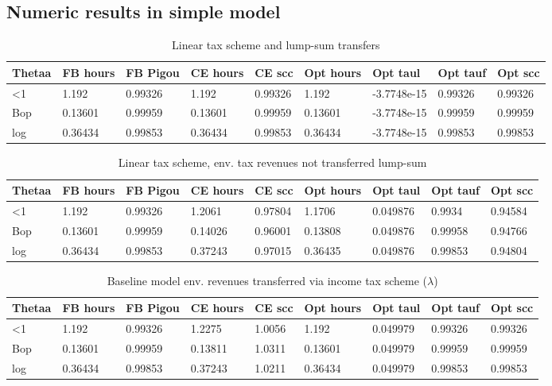 \subsection{Numeric results in simple model}
\begin{table}[h!!]
	\caption{Linear tax scheme and lump-sum transfers}\label{tab:lin_lst}
	\begin{tabular}{lllllllll}
		Thetaa & FB hours & FB Pigou & CE hours & CE scc & Opt hours & Opt taul & Opt tauf & Opt scc \\ 
		\hline 
		<1 & 1.192 & 0.99326 & 1.192 & 0.99326 & 1.192 & -3.7748e-15 & 0.99326 & 0.99326 \\ 
		Bop & 0.13601 & 0.99959 & 0.13601 & 0.99959 & 0.13601 & -3.7748e-15 & 0.99959 & 0.99959 \\ 
		log & 0.36434 & 0.99853 & 0.36434 & 0.99853 & 0.36434 & -3.7748e-15 & 0.99853 & 0.99853 \\ 
		\hline 
	\end{tabular}
\end{table}
\begin{table}
	\caption{Linear tax scheme, env. tax revenues not transferred lump-sum}\label{tab:lin_nolst}
	\begin{tabular}{lllllllll}
		Thetaa & FB hours & FB Pigou & CE hours & CE scc & Opt hours & Opt taul & Opt tauf & Opt scc \\ 
		\hline 
		<1 & 1.192 & 0.99326 & 1.2061 & 0.97804 & 1.1706 & 0.049876 & 0.9934 & 0.94584 \\ 
		Bop & 0.13601 & 0.99959 & 0.14026 & 0.96001 & 0.13808 & 0.049876 & 0.99958 & 0.94766 \\ 
		log & 0.36434 & 0.99853 & 0.37243 & 0.97015 & 0.36435 & 0.049876 & 0.99853 & 0.94804 \\ 
		\hline 
	\end{tabular}
\end{table}
\begin{table}[h!!]
	\caption{Baseline model env. revenues transferred via income tax scheme ($\lambda$)}\label{tab:base}
	\begin{tabular}{lllllllll}
		Thetaa & FB hours & FB Pigou & CE hours & CE scc & Opt hours & Opt taul & Opt tauf & Opt scc \\ 
		\hline 
		<1 & 1.192 & 0.99326 & 1.2275 & 1.0056 & 1.192 & 0.049979 & 0.99326 & 0.99326 \\ 
		Bop & 0.13601 & 0.99959 & 0.13811 & 1.0311 & 0.13601 & 0.049979 & 0.99959 & 0.99959 \\ 
		log & 0.36434 & 0.99853 & 0.37243 & 1.0211 & 0.36434 & 0.049979 & 0.99853 & 0.99853 \\ 
		\hline 
	\end{tabular}
\end{table}



